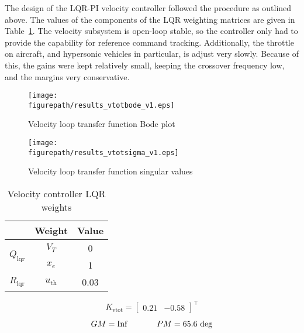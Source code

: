 The design of the LQR-PI velocity controller followed the procedure as outlined above.
The values of the components of the LQR weighting matrices are given in Table~\ref{vtot_weights_tab}.
The velocity subsystem is open-loop stable, so the controller only had to provide the capability for reference command tracking.
Additionally, the throttle on aircraft, and hypersonic vehicles in particular, is adjust very slowly.
Because of this, the gains were kept relatively small, keeping the crossover frequency low, and the margins very conservative.

\begin{figure}[H]
  \begin{center}
    \texttt{[image: \\figurepath/results\_vtotbode\_v1.eps]}
     \caption{Velocity loop transfer function Bode plot}
  \end{center}
\end{figure}

\begin{figure}[H]
  \begin{center}
    \texttt{[image: \\figurepath/results\_vtotsigma\_v1.eps]}
     \caption{Velocity loop transfer function singular values}
  \end{center}
\end{figure}

\begin{table}[h]
  \centering
  \caption{Velocity controller LQR weights}
  \small
  \begin{tabular}{ccc}
    \toprule
    & Weight & Value \\
    \midrule
    \multirow{2}{*}{$Q_{\text{lqr}}$} & $V_{T}$ & 0 \\
    & $x_{e}$ & 1 \\
    \midrule
    $R_{\text{lqr}}$ & $u_{\text{th}}$ & 0.03 \\
    \bottomrule
  \end{tabular}\label{vtot_weights_tab}
\end{table}

\begin{equation*}
  {K_{\text{vtot}}}=
  \left[
  \begin{array}{cc}
    0.21 & -0.58
  \end{array}\right]^{\top}
\end{equation*}

\begin{equation*}
  GM=\text{Inf}
  \hspace{0.5in}
  PM=65.6\text{~deg}
\end{equation*}

